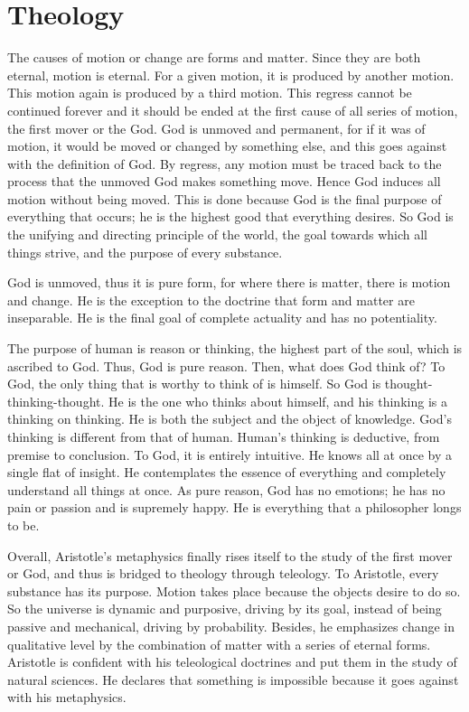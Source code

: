 \documentclass[11pt]{article}
\begin{document}
\section{Theology}
The causes of motion or change are forms and matter. 
Since they are both eternal, motion is eternal. 
For a given motion, it is produced by another motion. 
This motion again is produced by a third motion. 
This regress cannot be continued forever and it should be ended at the first cause of all series of motion, the first mover or the God. 
God is unmoved and permanent, for if it was of motion, it would be moved or changed by something else, and this goes against with the definition of God. 
By regress, any motion must be traced back to the process that the unmoved God makes something move. 
Hence God induces all motion without being moved. 
This is done because God is the final purpose of everything that occurs; 
he is the highest good that everything desires. 
So God is the unifying and directing principle of the world, the goal towards which all things strive, and the purpose of every substance.

\newline

God is unmoved, thus it is pure form, for where there is matter, there is motion and change. 
He is the exception to the doctrine that form and matter are inseparable. 
He is the final goal of complete actuality and has no potentiality.

\newline

The purpose of human is reason or thinking, the highest part of the soul, which is ascribed to God. 
Thus, God is pure reason. 
Then, what does God think of? 
To God, the only thing that is worthy to think of is himself. 
So God is thought-thinking-thought. 
He is the one who thinks about himself, and his thinking is a thinking on thinking. 
He is both the subject and the object of knowledge. 
God’s thinking is different from that of human. 
Human’s thinking is deductive, from premise to conclusion. 
To God, it is entirely intuitive. 
He knows all at once by a single flat of insight. 
He contemplates the essence of everything and completely understand all things at once. 
As pure reason, God has no emotions; 
he has no pain or passion and is supremely happy. 
He is everything that a philosopher longs to be.

\newline

Overall, Aristotle’s metaphysics finally rises itself to the study of the first mover or God, and thus is bridged to theology through teleology. 
To Aristotle, every substance has its purpose. 
Motion takes place because the objects desire to do so. 
So the universe is dynamic and purposive, driving by its goal, instead of being passive and mechanical, driving by probability. 
Besides, he emphasizes change in qualitative level by the combination of matter with a series of eternal forms. 
Aristotle is confident with his teleological doctrines and put them in the study of natural sciences. 
He declares that something is impossible because it goes against with his metaphysics. 
\end{document}
